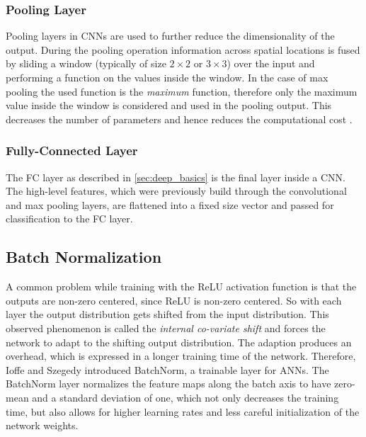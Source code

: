 \subsubsection{Pooling Layer}
\label{sec:max_pooling}

Pooling layers in \acp{CNN} are used to further reduce the dimensionality of the output.
During the pooling operation information across spatial locations is fused by sliding a window (typically of size $2\times2$ or $3\times3$) over the input and performing a function on the values inside the window.
In the case of max pooling the used function is the \textit{maximum} function, therefore only the maximum value inside the window is considered and used in the pooling output.
This decreases the number of parameters and hence reduces the computational cost \cite{dl}.

\subsubsection{Fully-Connected Layer}

The \ac{FC} layer as described in \ref{sec:deep_basics} is the final layer inside a \ac{CNN}.
The high-level features, which were previously build through the convolutional and max pooling layers, are flattened into a fixed size vector and passed for classification to the \ac{FC} layer.

\subsection{Batch Normalization}

A common problem while training with the \ac{ReLU} activation function is that the outputs are non-zero centered, since \ac{ReLU} is non-zero centered.
So with each layer the output distribution gets shifted from the input distribution.
This observed phenomenon is called the \textit{internal co-variate shift} and forces the network to adapt to the shifting output distribution.
The adaption produces an overhead, which is expressed in a longer training time of the network.
Therefore, Ioffe and Szegedy \cite{batchnorm} introduced \ac{BatchNorm}, a trainable layer for \acp{ANN}.
The \ac{BatchNorm} layer normalizes the feature maps along the batch axis to have zero-mean and a standard deviation of one, which not only decreases the training time, but also allows for higher learning rates and less careful initialization of the network weights.
